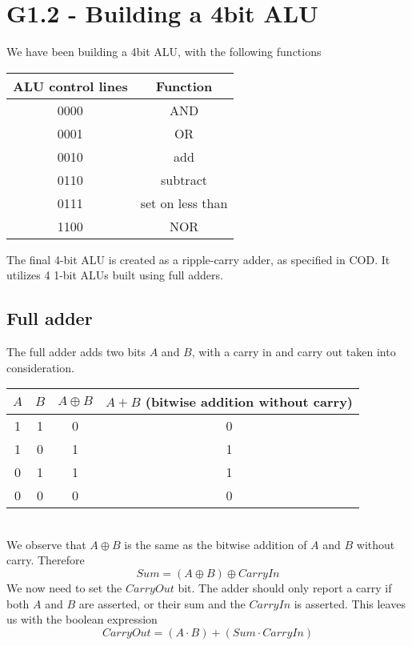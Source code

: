 \documentclass[11pt,a4paper]{article}
\begin{document}
\section*{G1.2 - Building a 4bit ALU}
We have been building a 4bit ALU, with the following functions
\begin{table}[htb!]
    \centering
    \begin{tabular}{| c | c |}
        ALU control lines & Function \\ \hline
        0000 & AND \\
        0001 & OR \\
        0010 & add \\
        0110 & subtract \\
        0111 & set on less than \\
        1100 & NOR \\
    \end{tabular}
\end{table}
The final 4-bit ALU is created as a ripple-carry adder, as specified in COD\@.
It utilizes 4 1-bit ALUs built using full adders.
\subsection*{Full adder} %
\label{sub:Full_adder}
The full adder adds two bits $A$ and $B$, with a carry in and carry out taken into
consideration. \begin{table}[htb!]
    \centering
    \begin{tabular}{c | c || c || c}
        $A$ & $B$ & $A \oplus B$ & $A + B$ (bitwise addition without carry) \\ \hline
        1 & 1 & 0                & 0        \\
        1 & 0 & 1                & 1        \\
        0 & 1 & 1                & 1        \\
        0 & 0 & 0                & 0        \\
    \end{tabular}
\end{table}
\\ We observe that $A \oplus B$ is the same as the bitwise addition
of $A$ and $B$ without carry. Therefore
\begin{equation*}
    Sum = (A \oplus B) \oplus CarryIn
\end{equation*}
We now need to set the $CarryOut$ bit. The adder should only report a
carry if both $A$ and $B$ are asserted, or their sum and the $CarryIn$ is asserted.
This leaves us with the boolean expression
\begin{equation*}
    CarryOut = (A \cdot B) + (Sum \cdot CarryIn)
\end{equation*}
\end{document}
